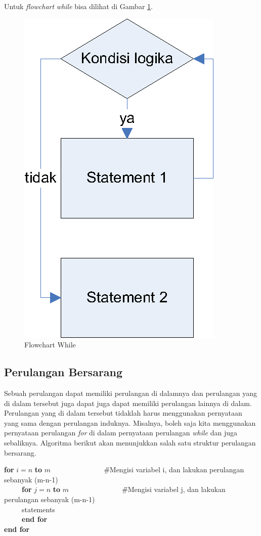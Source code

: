 Untuk \textit{flowchart} \textit{while} bisa dilihat di Gambar \ref{fig:flowchartWhile}.
\begin{figure}%
\centering
\includegraphics[scale=0.6]{fig/flowchart-WHILE.eps}%
\caption{Flowchart While}%
\label{fig:flowchartWhile}%
\end{figure}


\FloatBarrier
\subsection{Perulangan Bersarang}
Sebuah perulangan dapat memiliki perulangan di dalamnya dan perulangan yang di dalam tersebut juga dapat juga dapat memiliki perulangan lainnya di dalam. Perulangan yang di dalam tersebut tidaklah harus menggunakan pernyataan yang sama dengan perulangan induknya. Misalnya, boleh saja kita menggunakan pernyataan perulangan \textit{for} di dalam pernyataan perulangan \textit{while} dan juga sebaliknya. Algoritma berikut akan menunjukkan salah satu struktur perulangan bersarang.

\begin{tabbing}
\textbf{for} $i=n$ \textbf{to} $m$~~~~~~~~~~~~~~~\=\#Mengisi variabel i, dan lakukan perulangan sebanyak (m-n-1)\\
~~~~~\textbf{for} $j=n$ \textbf{to} $m$~~~~~~~~~~~~~~~\=\#Mengisi variabel j, dan lakukan perulangan sebanyak (m-n-1)\\
~~~~~statements\\
~~~~~\textbf{end for}\\
\textbf{end for}
\end{tabbing}

